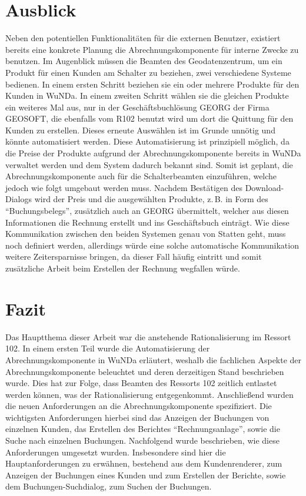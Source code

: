 \section{Ausblick}
Neben den potentiellen Funktionalitäten für die externen Benutzer, existiert bereits eine konkrete Planung die Abrechnungskomponente für interne Zwecke zu benutzen.
Im Augenblick müssen die Beamten des Geodatenzentrum, um ein Produkt für einen Kunden am Schalter zu beziehen, zwei verschiedene Systeme bedienen.
In einem ersten Schritt beziehen sie ein oder mehrere Produkte für den Kunden in \ac{WuNDa}.
In einem zweiten Schritt wählen sie die gleichen Produkte ein weiteres Mal aus, nur in der Geschäftsbuchlösung GEORG der Firma GEOSOFT, die ebenfalls vom R102 benutzt wird um dort die Quittung für den Kunden zu erstellen.
Dieses erneute Auswählen ist im Grunde unnötig und könnte automatisiert werden.
Diese Automatisierung ist prinzipiell möglich, da die Preise der Produkte aufgrund der Abrechnungskomponente bereits in \ac{WuNDa} verwaltet werden und dem System dadurch bekannt sind.
Somit ist geplant, die Abrechnungskomponente auch für die Schalterbeamten einzuführen, welche jedoch wie folgt umgebaut werden muss.
Nachdem Bestätigen des Download-Dialogs wird der Preis und die ausgewählten Produkte, z.\,B. in Form des \enquote{Buchungsbelegs}, zusätzlich auch an GEORG übermittelt, welcher aus diesen Informationen die Rechnung erstellt und ins Geschäftsbuch einträgt.
Wie diese Kommunikation zwischen den beiden Systemen genau von Statten geht, muss noch definiert werden, allerdings würde eine solche automatische Kommunikation weitere Zeitersparnisse bringen, da dieser Fall häufig eintritt und somit zusätzliche Arbeit beim Erstellen der Rechnung wegfallen würde.

\section{Fazit}
Das Hauptthema dieser Arbeit war die anstehende Rationalisierung  im Ressort 102.
In einem ersten Teil wurde die Automatisierung der Abrechnungskomponente in \ac{WuNDa} erläutert, weshalb die fachlichen Aspekte der Abrechnungskomponente beleuchtet und deren derzeitigen Stand beschrieben wurde.
Dies hat zur Folge, dass Beamten des Ressorts 102 zeitlich entlastet werden können, was der Rationalisierung entgegenkommt.
Anschließend wurden die neuen Anforderungen an die Abrechnungskomponente spezifiziert.
Die wichtigsten Anforderungen hierbei sind das Anzeigen der Buchungen von einzelnen Kunden, das Erstellen des Berichtes \enquote{Rechnungsanlage}, sowie die Suche nach einzelnen Buchungen.
Nachfolgend wurde beschrieben, wie diese Anforderungen umgesetzt wurden.
Insbesondere sind hier die Hauptanforderungen zu erwähnen, bestehend aus dem Kundenrenderer, zum Anzeigen der Buchungen eines Kunden und zum Erstellen der Berichte, sowie dem Buchungen-Suchdialog, zum Suchen der Buchungen.

